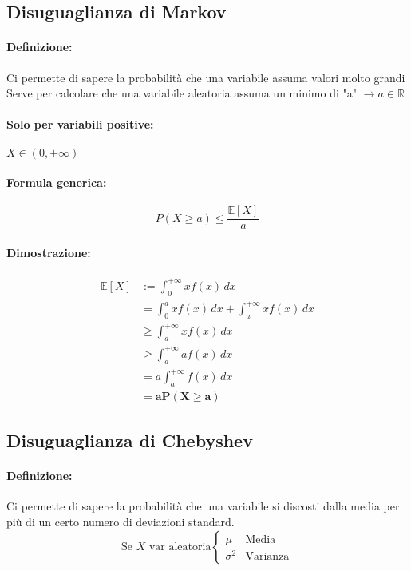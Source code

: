 \documentclass[]{article}
\newcommand{\ev}{\mathbb{E}[X]}
\renewcommand{\ev}[1]{\mathbb{E}[#1]}
\newcommand{\definizione}{\paragraph{Definizione:}}
\newcommand{\formula}{\paragraph{Formula generica:}}
\begin{document}
    \subsection{Disuguaglianza di Markov}
    \definizione Ci permette di sapere la probabilità che una variabile assuma valori molto grandi \\
    Serve per calcolare che una variabile aleatoria assuma un minimo di "a" $\longrightarrow a \in \mathbb{R}$

    \paragraph{Solo per variabili positive:} $X \in (0, +\infty) $
    \formula \[ P(X \geq a) \leq \frac{\ev{X}}{a}\]

    \paragraph{Dimostrazione:}
    \begin{equation*}
        \begin{split}
            \ev{X} & := \int_{0}^{+\infty} xf(x) \, dx \\
            & = \int_{0}^{a} x f(x) \, dx + \int_{a}^{+\infty} x f(x) \, dx \\ 
            & \geq \int_{a}^{+\infty} x f(x) \, dx \\ 
            & \geq \int_{a}^{+\infty} a f(x) \, dx \\
            & = a \int_{a}^{+\infty} f(x) \, dx \\ 
            & = \boldsymbol{aP(X \geq a)}
        \end{split}
    \end{equation*}
    
    \subsection{Disuguaglianza di Chebyshev}
    \definizione Ci permette di sapere la probabilità che una variabile si discosti dalla media per più di un certo numero di deviazioni standard.
    \begin{equation*}
        \text{Se } X \text{ var aleatoria}
        \begin{cases}
            \mu & \text{Media} \\
            \sigma^2 & \text{Varianza}
        \end{cases}
    \end{equation*}
\end{document}
